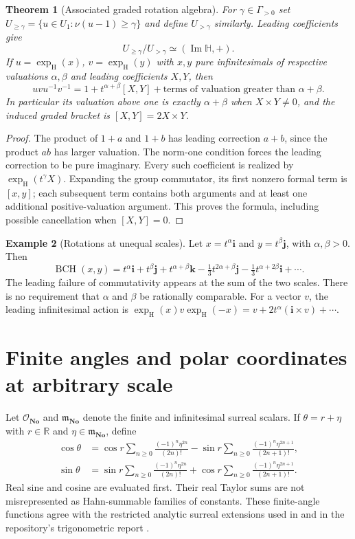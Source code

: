 \documentclass[11pt,letterpaper]{article}
\newtheorem{theorem}{Theorem}[section]
\theoremstyle{definition}
\newtheorem{example}[theorem]{Example}
\newcommand{\No}{\mathbf{No}}
\newcommand{\R}{\mathbb R}
\newcommand{\HH}{\mathbb H}
\newcommand{\OO}{\mathcal O}
\newcommand{\mm}{\mathfrak m}
\newcommand{\ii}{\mathbf i}
\newcommand{\jj}{\mathbf j}
\newcommand{\kk}{\mathbf k}
\newcommand{\val}{\nu}
\DeclareMathOperator{\Imag}{Im}
\DeclareMathOperator{\BCH}{BCH}
\newcommand{\exph}{\operatorname{exp}_{\mathrm H}}
\begin{document}
\begin{theorem}[Associated graded rotation algebra]
\label{thm:graded}
For $\gamma\in\Gamma_{>0}$ set
$U_{\ge\gamma}=\{u\in U_1:\val(u-1)\ge\gamma\}$ and define
$U_{>\gamma}$ similarly. Leading coefficients give
\[
 U_{\ge\gamma}/U_{>\gamma}\simeq(\Imag\HH,+).
\]
If $u=\exph(x)$, $v=\exph(y)$ with $x,y$ pure infinitesimals of respective
valuations $\alpha,\beta$ and leading coefficients $X,Y$, then
\[
 uvu^{-1}v^{-1}=1+t^{\alpha+\beta}[X,Y]
     +\text{terms of valuation greater than }\alpha+\beta.
\]
In particular its valuation above one is exactly $\alpha+\beta$ when
$X\times Y\ne0$, and the induced graded bracket is $[X,Y]=2X\times Y$.
\end{theorem}
\begin{proof}
The product of $1+a$ and $1+b$ has leading correction $a+b$, since the product
$a b$ has larger valuation. The norm-one condition forces the leading
correction to be pure imaginary. Every such coefficient is realized by
$\exph(t^\gamma X)$. Expanding the group commutator, its first nonzero formal
term is $[x,y]$; each subsequent term contains both arguments and at least one
additional positive-valuation argument. This proves the formula, including
possible cancellation when $[X,Y]=0$.
\end{proof}

\begin{example}[Rotations at unequal scales]
Let $x=t^\alpha\ii$ and $y=t^\beta\jj$, with $\alpha,\beta>0$. Then
\[
 \BCH(x,y)=t^\alpha\ii+t^\beta\jj+t^{\alpha+\beta}\kk
 -\tfrac13t^{2\alpha+\beta}\jj
 -\tfrac13t^{\alpha+2\beta}\ii+\cdots.
\]
The leading failure of commutativity appears at the sum of the two scales.
There is no requirement that $\alpha$ and $\beta$ be rationally comparable.
For a vector $v$, the leading infinitesimal action is
$\exph(x)v\exph(-x)=v+2t^\alpha(\ii\times v)+\cdots$.
\end{example}

\section{Finite angles and polar coordinates at arbitrary scale}
\label{sec:angles}
Let $\OO_{\No}$ and $\mm_{\No}$ denote the finite and infinitesimal surreal
scalars. If $\theta=r+\eta$ with $r\in\R$ and $\eta\in\mm_{\No}$, define
\begin{align*}
 \cos\theta&=\cos r\sum_{n\ge0}\frac{(-1)^n\eta^{2n}}{(2n)!}
 -\sin r\sum_{n\ge0}\frac{(-1)^n\eta^{2n+1}}{(2n+1)!},\\
 \sin\theta&=\sin r\sum_{n\ge0}\frac{(-1)^n\eta^{2n}}{(2n)!}
 +\cos r\sum_{n\ge0}\frac{(-1)^n\eta^{2n+1}}{(2n+1)!}.
\end{align*}
Real sine and cosine are evaluated first. Their real Taylor sums are not
misrepresented as Hahn-summable families of constants. These finite-angle
functions agree with the restricted analytic surreal extensions used in
\cite{ek} and in the repository's trigonometric report \cite{repo}.
\end{document}
